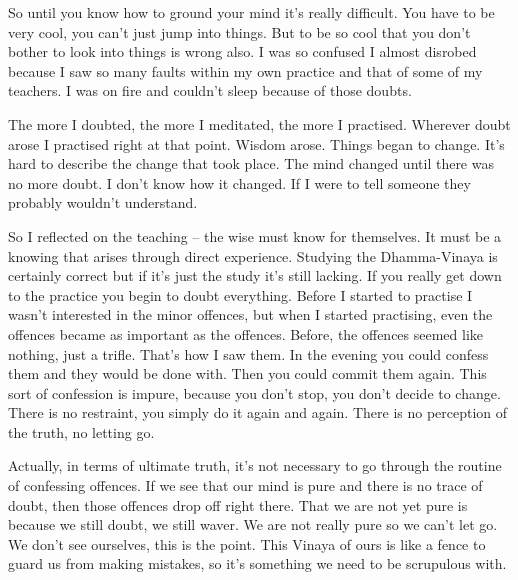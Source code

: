 So until you know how to ground your mind it's really difficult. You have to be very cool, you can't just jump into things. But to be so cool that you don't bother to look into things is wrong also. I was so confused I almost disrobed because I saw so many faults within my own practice and that of some of my teachers. I was on fire and couldn't sleep because of those doubts. 

The more I doubted, the more I meditated, the more I practised. Wherever doubt arose I practised right at that point. Wisdom arose. Things began to change. It's hard to describe the change that took place. The mind changed until there was no more doubt. I don't know how it changed. If I were to tell someone they probably wouldn't understand. 

So I reflected on the teaching  -- the wise must know for themselves. It must be a knowing that arises through direct experience. Studying the Dhamma-Vinaya is certainly correct but if it's just the study it's still lacking. If you really get down to the practice you begin to doubt everything. Before I started to practise I wasn't interested in the minor offences, but when I started practising, even the  offences became as important as the  offences. Before, the  offences seemed like nothing, just a trifle. That's how I saw them. In the evening you could confess them and they would be done with. Then you could commit them again. This sort of confession is impure, because you don't stop, you don't decide to change. There is no restraint, you simply do it again and again. There is no perception of the truth, no letting go. 

Actually, in terms of ultimate truth, it's not necessary to go through the routine of confessing offences. If we see that our mind is pure and there is no trace of doubt, then those offences drop off right there. That we are not yet pure is because we still doubt, we still waver. We are not really pure so we can't let go. We don't see ourselves, this is the point. This Vinaya of ours is like a fence to guard us from making mistakes, so it's something we need to be scrupulous with. 

